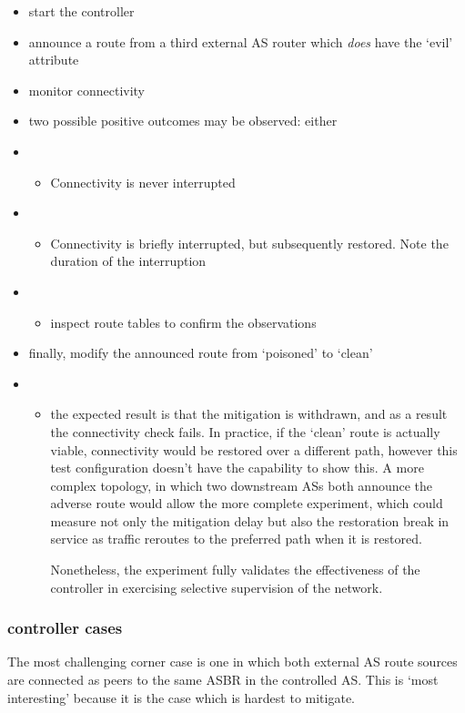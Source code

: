 \begin{itemize}
    \item start the \hbgp controller
    \item announce a route from a third external AS router which \textit{does} have the `evil' attribute
    \item monitor connectivity
    \item two possible positive outcomes may be observed:
    either
    \item \begin{itemize}
        \item Connectivity is never interrupted
    \end{itemize}
    \item \begin{itemize}
        \item Connectivity is briefly interrupted, but subsequently restored.  Note the duration of the interruption
    \end{itemize}
    \item \begin{itemize}
        \item inspect route tables to confirm the observations
    \end{itemize}
    \item finally, modify the announced route from `poisoned' to `clean'
    \item \begin{itemize}
        \item the expected result is that the mitigation is withdrawn, and as a result the connectivity check fails.
        In practice, if the `clean' route is actually viable, connectivity would be restored over a different path, however this test configuration doesn't have the capability to show this.  A more complex topology, in which two downstream ASs both announce the adverse route would allow the more complete experiment, which could measure not only the mitigation delay but also the restoration break in service as traffic reroutes to the preferred path when it is restored.

        Nonetheless, the experiment fully validates the effectiveness of the controller in exercising selective supervision of the network.
    \end{itemize}
\end{itemize}

\subsubsection{controller cases}
The most challenging corner case is one in which both external AS route sources are connected as peers to the same ASBR in the controlled AS.  This is `most interesting' because it is the case which is hardest to mitigate.

